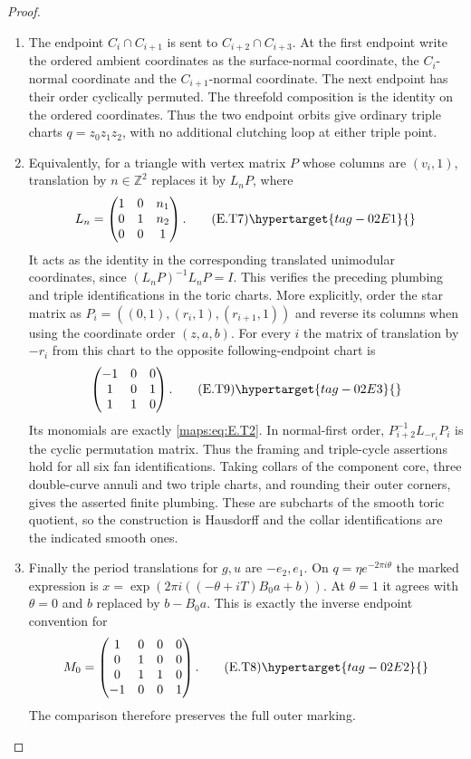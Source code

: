 \begin{proof}
\begin{enumerate}[label={$\langle1\rangle$\arabic*.},leftmargin=*]
\item The endpoint $C_i\cap C_{i+1}$ is sent to
$C_{i+2}\cap C_{i+3}$.  At the first endpoint write the
ordered ambient coordinates as the surface-normal coordinate,
the $C_i$-normal coordinate and the $C_{i+1}$-normal coordinate.
The next endpoint has their order cyclically permuted.
The threefold composition is the identity on the ordered coordinates.  Thus the two endpoint orbits give
ordinary triple charts $q=z_0z_1z_2$, with no additional
clutching loop at either triple point.

\item Equivalently, for a triangle with vertex matrix $P$ whose
columns are $(v_i,1)$, translation by $n\in\mathbb Z^2$
replaces it by $L_nP$, where
\[
 L_n=\begin{pmatrix}1&0&n_1\\0&1&n_2\\0&0&1\end{pmatrix}.
 \tag{E.T7}\hypertarget{tag-02E1}{}\label{maps:eq:E.T7}
\]
It acts as the identity in the corresponding translated
unimodular coordinates, since
$(L_nP)^{-1}L_nP=I$.  This verifies the preceding plumbing
and triple identifications in the toric charts.
More explicitly, order the star matrix as
$P_i=((0,1),(r_i,1),(r_{i+1},1))$ and reverse its
columns when using the coordinate order $(z,a,b)$.
For every $i$ the matrix of translation by $-r_i$ from
this chart to the opposite following-endpoint chart is
\[
 \begin{pmatrix}-1&0&0\\1&0&1\\1&1&0\end{pmatrix}.
 \tag{E.T9}\hypertarget{tag-02E3}{}\label{maps:eq:E.T9}
\]
Its monomials are exactly \eqref{maps:eq:E.T2}.  In normal-first order,
$P_{i+2}^{-1}L_{-r_i}P_i$ is the cyclic permutation
matrix.  Thus the framing and triple-cycle assertions hold for all six fan identifications.
Taking collars of the component core, three double-curve
annuli and two triple charts, and rounding their outer
corners, gives the asserted finite plumbing.  These are
subcharts of the smooth toric quotient, so the construction
is Hausdorff and the collar identifications are the indicated
smooth ones.

\item Finally the period translations for $g,u$ are $-e_2,e_1$.
On $q=\eta e^{-2\pi i\theta}$ the marked expression is
$x=\exp(2\pi i((-\theta+iT)B_0a+b))$.
At $\theta=1$ it agrees with $\theta=0$ and
$b$ replaced by $b-B_0a$.  This is exactly the inverse
endpoint convention for
\[
 M_0=\begin{pmatrix}
 1&0&0&0\\0&1&0&0\\0&1&1&0\\-1&0&0&1
 \end{pmatrix}.
 \tag{E.T8}\hypertarget{tag-02E2}{}\label{maps:eq:E.T8}
\]
The comparison therefore preserves the full outer marking.

\end{enumerate}
\end{proof}


